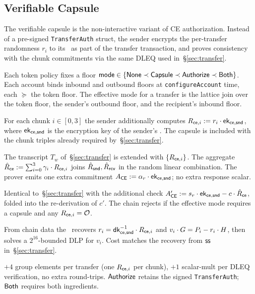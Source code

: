 \subsection{Verifiable Capsule }
\label{sec:capsule}

The verifiable capsule is the non-interactive variant of CE
authorization.
Instead of a pre-signed \texttt{TransferAuth} struct, the sender
encrypts the per-transfer randomness $r_i$ to its \CE\ as part of the
transfer transaction, and proves consistency with the chunk
commitments via the same DLEQ used in~\S\ref{sec:transfer}.

\one
{}
Each token policy fixes a floor
$\mathsf{mode} \in \{\mathsf{None} \prec \mathsf{Capsule} \prec \mathsf{Authorize} \prec \mathsf{Both}\}$.
Each account binds inbound and outbound floors at
\texttt{configureAccount} time, each $\succeq$ the token floor.
The effective mode for a transfer is the lattice join over the token
floor, the sender's outbound floor, and the recipient's inbound
floor.

\one
{}
For each chunk $i \in [0,3]$ the sender additionally computes
$R_{{\sf ce},i} := r_i \cdot \textsf{ek}_{{\sf ce},{\sf snd}}$, where $\textsf{ek}_{{\sf ce},{\sf snd}}$ is the encryption
key of the sender's \CE.
The capsule is included with the chunk triples already required
by~\S\ref{sec:transfer}.

\one
{}
The transcript $T_w$ of~\S\ref{sec:transfer} is extended with
$\{R_{{\sf ce},i}\}$.
The aggregate $\hat{R}_{\sf ce} := \sum_{i=0}^{3} \gamma_i \cdot R_{{\sf ce},i}$ joins
$\hat{R}_{\sf snd}, \hat{R}_{\sf rcv}$ in the random linear combination.
The prover emits one extra commitment
$A_\mathsf{CE} := \alpha_r \cdot \textsf{ek}_{{\sf ce},{\sf snd}}$; no extra response scalar.

\one
{}
Identical to~\S\ref{sec:transfer} with the additional check
$A'_\mathsf{CE} := s_r \cdot \textsf{ek}_{{\sf ce},{\sf snd}} - c \cdot \hat{R}_{\sf ce}$, folded into the
re-derivation of $c'$.
The chain rejects if the effective mode requires a capsule and any
$R_{{\sf ce},i} = \mathcal{O}$.

\one
{}
From chain data the \CE\ recovers
$r_i = \textsf{dk}_{{\sf ce},{\sf snd}}^{-1} \cdot R_{{\sf ce},i}$ and
$v_i \cdot G = P_{i} - r_i \cdot H$, then solves a
$2^{16}$-bounded DLP for $v_i$.
Cost matches the recovery from $\mathsf{ss}$ in~\S\ref{sec:transfer}.

\one
{}
$+4$ group elements per transfer (one $R_{{\sf ce},i}$ per chunk),
$+1$ scalar-mult per DLEQ verification, no extra round-trips.
$\mathsf{Authorize}$ retains the signed \texttt{TransferAuth};
$\mathsf{Both}$ requires both ingredients.
